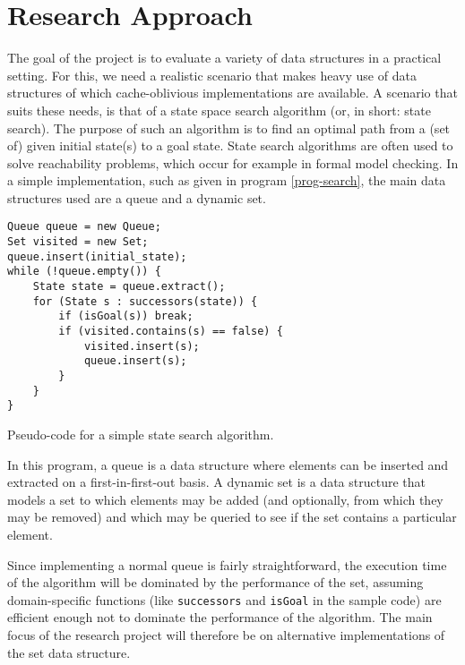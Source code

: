\documentclass{acm_proc_article-sp}
\begin{document}
\section{Research Approach}
The goal of the project is to evaluate a variety of data structures in a practical setting. For this, we need a realistic scenario that makes heavy use of data structures of which cache-oblivious implementations are available. A scenario that suits these needs, is that of a state space search algorithm (or, in short: state search). The purpose of such an algorithm is to find an optimal path from a (set of) given initial state(s) to a goal state. State search algorithms are often used to solve reachability problems, which occur for example in formal model checking. In a simple implementation, such as given in program \ref{prog-search}, the main data structures used are a queue and a dynamic set.

\begin{program}
\begin{verbatim}
Queue queue = new Queue;
Set visited = new Set;
queue.insert(initial_state);
while (!queue.empty()) {
    State state = queue.extract();
    for (State s : successors(state)) {
        if (isGoal(s)) break;
        if (visited.contains(s) == false) {
            visited.insert(s);
            queue.insert(s);
        }
    }
}
\end{verbatim}
\caption{Pseudo-code for a simple state search algorithm.}
\label{prog-search}
\end{program}

In this program, a queue is a data structure where elements can be inserted and extracted on a first-in-first-out basis. A dynamic set is a data structure that models a set to which elements may be added (and optionally, from which they may be removed) and which may be queried to see if the set contains a particular element.

Since implementing a normal queue is fairly straightforward, the execution time of the algorithm will be dominated by the performance of the set, assuming domain-specific functions (like \verb#successors# and \verb#isGoal# in the sample code) are efficient enough not to dominate the performance of the algorithm. The main focus of the research project will therefore be on alternative implementations of the set data structure.

\end{document}
